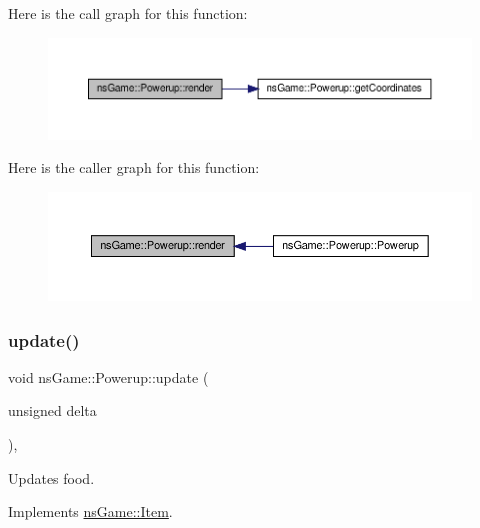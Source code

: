 Here is the call graph for this function\+:\nopagebreak
\begin{figure}[H]
\begin{center}
\leavevmode
\includegraphics[width=350pt]{classns_game_1_1_powerup_ad113cfd795157168c103b71560180201_cgraph}
\end{center}
\end{figure}
Here is the caller graph for this function\+:\nopagebreak
\begin{figure}[H]
\begin{center}
\leavevmode
\includegraphics[width=350pt]{classns_game_1_1_powerup_ad113cfd795157168c103b71560180201_icgraph}
\end{center}
\end{figure}
\mbox{\label{classns_game_1_1_powerup_a0f86905ba37cc0a4e80827db0563cfa3}} 
\subsubsection{\texorpdfstring{update()}{update()}}
{\footnotesize\ttfamily void ns\+Game\+::\+Powerup\+::update (\begin{DoxyParamCaption}\item[{unsigned}]{delta }\end{DoxyParamCaption})\hspace{0.3cm}{\ttfamily [override]}, {\ttfamily [virtual]}}



Updates food. 



Implements \hyperlink{structns_game_1_1_item_a96c07d0f91eef0d77e91d1a7397091a1}{ns\+Game\+::\+Item}.



